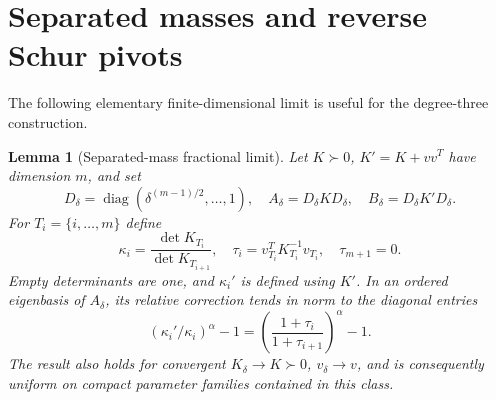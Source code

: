 \documentclass[11pt]{article}
\newtheorem{lemma}[theorem]{Lemma}
\newcommand{\diag}{\operatorname{diag}}
\begin{document}
\section{Separated masses and reverse Schur pivots}
The following elementary finite-dimensional limit is useful for the
degree-three construction.

\begin{lemma}[Separated-mass fractional limit]\label{lem:pivots}
Let $K\succ0$, $K'=K+vv^T$ have dimension $m$, and set
\[
 D_\delta=\diag(\delta^{(m-1)/2},\ldots,1),\quad
 A_\delta=D_\delta K D_\delta,\quad B_\delta=D_\delta K'D_\delta.
\]
For $T_i=\{i,\ldots,m\}$ define
\[
 \kappa_i=\frac{\det K_{T_i}}{\det K_{T_{i+1}}},\quad
 \tau_i=v_{T_i}^TK_{T_i}^{-1}v_{T_i},\quad \tau_{m+1}=0.
\]
Empty determinants are one, and $\kappa_i'$ is defined using $K'$.
In an ordered eigenbasis of $A_\delta$, its relative correction tends
in norm to the diagonal entries
\[
 (\kappa_i'/\kappa_i)^\alpha-1
       =\left(\frac{1+\tau_i}{1+\tau_{i+1}}\right)^\alpha-1.
\]
The result also holds for convergent $K_\delta\to K\succ0$,
$v_\delta\to v$, and is consequently uniform on compact parameter
families contained in this class.
\end{lemma}
\end{document}
